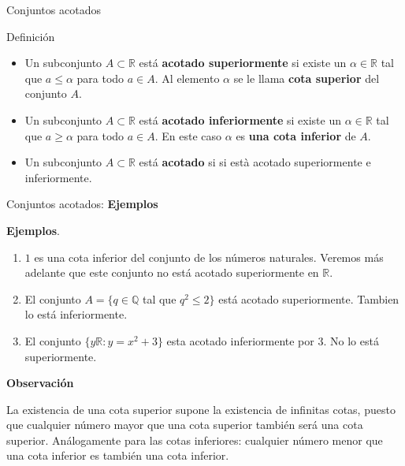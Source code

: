 \documentclass[
  ignorenonframetext,
]{beamer}
\begin{document}
\begin{frame}{Conjuntos acotados}
\protect\hypertarget{conjuntos-acotados}{}

Definición

\begin{itemize}
\item
  Un subconjunto \(A \subset \mathbb{R}\) está \textbf{acotado
  superiormente} si existe un \(\alpha \in \mathbb{R}\) tal que
  \(a \leq \alpha\) para todo \(a \in A\). Al elemento \(\alpha\) se le
  llama \textbf{cota superior} del conjunto \(A\).
\item
  Un subconjunto \(A \subset \mathbb{R}\) está \textbf{acotado
  inferiormente} si existe un \(\alpha \in \mathbb{R}\) tal que
  \(a \geq \alpha\) para todo \(a \in A\). En este caso \(\alpha\) es
  \textbf{una cota inferior} de \(A\).
\item
  Un subconjunto \(A \subset \mathbb{R}\) está \textbf{acotado} si si
  està acotado superiormente e inferiormente.
\end{itemize}

\end{frame}

\begin{frame}{Conjuntos acotados: \textbf{Ejemplos}}
\protect\hypertarget{conjuntos-acotados-ejemplos}{}

\textbf{Ejemplos}.

\begin{enumerate}
[1)]
\item
  \(1\) es una cota inferior del conjunto de los números naturales.
  Veremos más adelante que este conjunto no está acotado superiormente
  en \(\mathbb{R}\).
\item
  El conjunto \(A =\{q \in \mathbb{Q}\) tal que \(q^2 \leq 2 \}\) está
  acotado superiormente. Tambien lo está inferiormente.
\item
  El conjunto \(\{ y \mathbb{R}: y=x^2+3\}\) esta acotado inferiormente
  por \(3\). No lo está superiormente.
\end{enumerate}

\textbf{Observación}

La existencia de una cota superior supone la existencia de infinitas
cotas, puesto que cualquier número mayor que una cota superior también
será una cota superior. Análogamente para las cotas inferiores:
cualquier número menor que una cota inferior es también una cota
inferior.

\end{frame}
\end{document}
